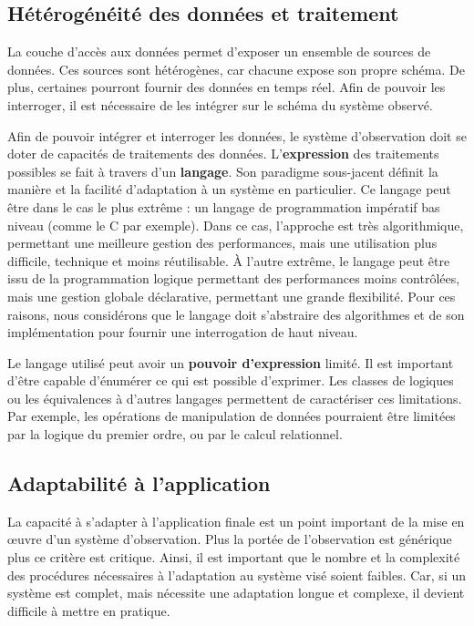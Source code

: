 \subsection{Hétérogénéité des données et traitement}
La couche d'accès aux données permet d'exposer un ensemble de sources de données. Ces sources sont hétérogènes, car chacune expose son propre schéma. De plus, certaines pourront fournir des données en temps réel. Afin de pouvoir les interroger, il est nécessaire de les intégrer sur le schéma du système observé.

Afin de pouvoir intégrer et interroger les données, le système d'observation doit se doter de capacités de traitements des données. L'\textbf{expression} des traitements possibles se fait à travers d'un \textbf{langage}. Son paradigme sous-jacent définit la manière et la facilité d'adaptation à un système en particulier. Ce langage peut être dans le cas le plus extrême : un langage de programmation impératif bas niveau (comme le C par exemple). Dans ce cas, l'approche est très algorithmique, permettant une meilleure gestion des performances, mais une utilisation plus difficile, technique et moins réutilisable. À l'autre extrême, le langage peut être issu de la programmation logique permettant des performances moins contrôlées, mais une gestion globale déclarative, permettant une grande flexibilité. Pour ces raisons, nous considérons que le langage doit s'abstraire des algorithmes et de son implémentation pour fournir une interrogation de haut niveau.

Le langage utilisé peut avoir un \textbf{pouvoir d'expression} limité. Il est important d'être capable d'énumérer ce qui est possible d'exprimer. Les classes de logiques ou les équivalences à d'autres langages permettent de caractériser ces limitations. Par exemple, les opérations de manipulation de données pourraient être limitées par la logique du premier ordre, ou par le calcul relationnel.

\subsection{Adaptabilité à l'application}
La capacité à s'adapter à l'application finale est un point important de la mise en œuvre d'un système d'observation. Plus la portée de l'observation est générique plus ce critère est critique. Ainsi, il est important que le nombre et la complexité des procédures nécessaires à l'adaptation au système visé soient faibles. Car, si un système est complet, mais nécessite une adaptation longue et complexe, il devient difficile à mettre en pratique.

